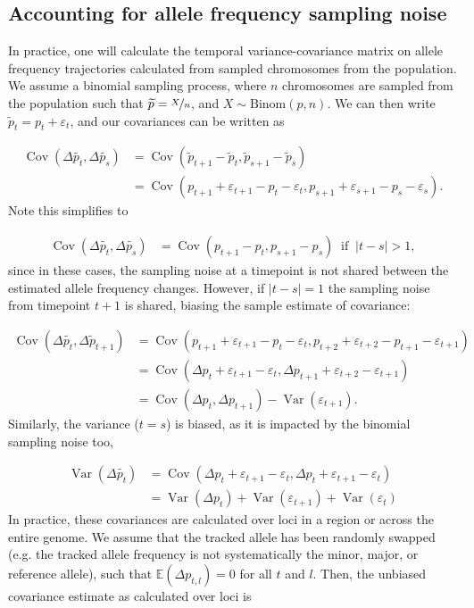 \documentclass[11pt]{article}
\newcommand{\E}{\mathbb{E}}
\DeclareMathOperator{\var}{Var}
\DeclareMathOperator{\cov}{Cov}
\begin{document}
\subsection{Accounting for allele frequency sampling noise}
\label{sec:sampling}

In practice, one will calculate the temporal variance-covariance matrix on
allele frequency trajectories calculated from sampled chromosomes from the
population. We assume a binomial sampling process, where $n$ chromosomes are
sampled from the population such that $\widetilde{p} = \nicefrac{X}{n}$, and $X
\sim \textrm{Binom}(p, n)$. We can then write $\widetilde{p}_t = p_t +
\varepsilon_t$, and our covariances can be written as

\begin{align}
  \cov(\Delta \widetilde{p_t}, \Delta \widetilde{p_s}) &= \cov(\widetilde{p}_{t+1} - \widetilde{p}_{t}, \widetilde{p}_{s+1} - \widetilde{p}_{s}) \nonumber \\
  &= \cov(p_{t+1} + \varepsilon_{t+1} - p_{t} - \varepsilon_{t}, p_{s+1} + \varepsilon_{s+1} - p_{s} - \varepsilon_{s}).
\end{align}
%
Note this simplifies to

\begin{align}
  \cov(\Delta \widetilde{p_t}, \Delta \widetilde{p_s}) &= \cov(p_{t+1} - p_{t}, p_{s+1} - p_{s}) \; \; \mathrm{if} \;\; |t-s| > 1,
\end{align}
%
since in these cases, the sampling noise at a timepoint is not shared between
the estimated allele frequency changes. However, if $|t - s| = 1$ the sampling
noise from timepoint $t+1$ is shared, biasing the sample estimate of
covariance:

\begin{align}
\cov(\Delta \widetilde{p_t}, \Delta \widetilde{p}_{t+1}) 
  &= \cov(p_{t+1} + \varepsilon_{t+1} - p_{t} - \varepsilon_{t}, p_{t+2} + \varepsilon_{t+2} - p_{t+1} - \varepsilon_{t+1}) \nonumber \\
  &= \cov( \Delta p_{t} + \varepsilon_{t+1} - \varepsilon_{t}, \Delta p_{t+1} + \varepsilon_{t+2} - \varepsilon_{t+1}) \nonumber \\
  &= \cov(\Delta p_{t}, \Delta p_{t+1}) - \var(\varepsilon_{t+1}).
\end{align}
%
Similarly, the variance ($t = s$) is biased, as it is impacted by the binomial
sampling noise too,
%

\begin{align} 
  \var(\Delta \widetilde{p_t}) &= \cov( \Delta p_{t} + \varepsilon_{t+1} - 
      \varepsilon_{t}, \Delta p_{t} + \varepsilon_{t+1} - \varepsilon_{t}) \nonumber \\ 
                               &= \var( \Delta p_{t} ) + \var(\varepsilon_{t+1}) +
\var(\varepsilon_{t}) \end{align}
%
In practice, these covariances are calculated over loci in a region or across the
entire genome. We assume that the tracked allele has been randomly swapped
(e.g. the tracked allele frequency is not systematically the minor, major, or
reference allele), such that $\E(\Delta p_{t,l}) = 0$ for all $t$ and $l$. Then,
the unbiased covariance estimate as calculated over loci is
\end{document}
